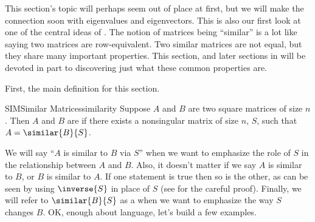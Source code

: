 %
This section's topic will perhaps seem out of place at first, but we will make the connection soon with eigenvalues and eigenvectors.  This is also our first look at one of the central ideas of .
%
%
The notion of matrices being ``similar'' is a lot like saying two matrices are row-equivalent.  Two similar matrices are not equal, but they share many important properties.  This section, and later sections in  will be devoted in part to discovering just what these common properties are.\par
%
First, the main definition for this section.
%
\begin{definition}{SIM}{Similar Matrices}{similarity}
Suppose $A$ and $B$ are two square matrices of size $n$.  Then $A$ and $B$ are  if there exists a nonsingular matrix of size $n$, $S$, such that $A=\similar{B}{S}$.
\end{definition}
%
We will say ``$A$ is similar to $B$ via $S$'' when we want to emphasize the role of $S$ in the relationship between $A$ and $B$.  Also, it doesn't matter if we say $A$ is similar to $B$, or $B$ is similar to $A$.  If one statement is true then so is the other, as can be seen by using $\inverse{S}$ in place of $S$ (see  for the careful proof).    Finally, we will refer to $\similar{B}{S}$ as a  when we want to emphasize the way $S$ changes $B$.  OK, enough about language, let's build a few examples.  
%
%
